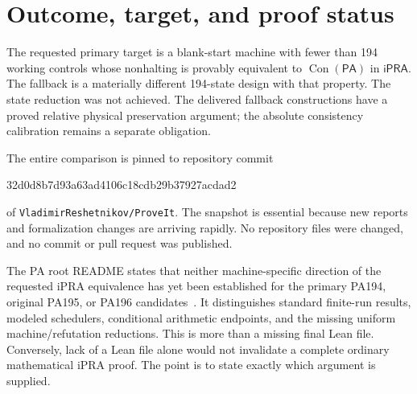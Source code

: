 \documentclass[10pt,letterpaper]{article}
\newcommand{\ipra}{\mathsf{iPRA}}
\newcommand{\pa}{\mathsf{PA}}
\newcommand{\Con}{\operatorname{Con}}
\newcommand{\snapshot}{32d0d8b7d93a63ad4106c18cdb29b37927acdad2}
\begin{document}
\section{Outcome, target, and proof status}
\label{sec:status}

The requested primary target is a blank-start machine with fewer than 194
working controls whose nonhalting is provably equivalent to $\Con(\pa)$ in
$\ipra$. The fallback is a materially different 194-state design with that
property. The state reduction was not achieved. The delivered fallback
constructions have a proved relative physical preservation argument; the
absolute consistency calibration remains a separate obligation.

The entire comparison is pinned to repository commit
\begin{center}\small\ttfamily\snapshot\end{center}
of \texttt{VladimirReshetnikov/ProveIt}. The snapshot is essential because
new reports and formalization changes are arriving rapidly. No repository
files were changed, and no commit or pull request was published.

The PA root README states that neither machine-specific direction of the
requested iPRA equivalence has yet been established for the primary PA194,
original PA195, or PA196 candidates~\cite{pa-status}. It distinguishes
standard finite-run results, modeled schedulers, conditional arithmetic
endpoints, and the missing uniform machine/refutation reductions. This
is more than a missing final Lean file. Conversely, lack of a Lean file
alone would not invalidate a complete ordinary mathematical iPRA proof.
The point is to state exactly which argument is supplied.
\end{document}
